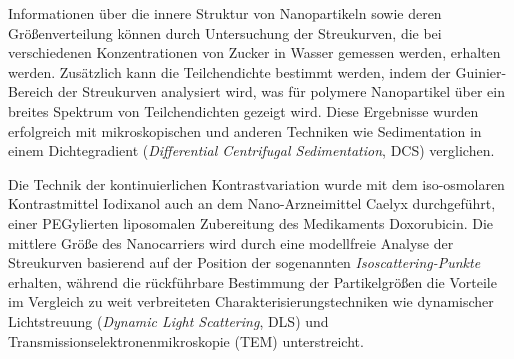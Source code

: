 


Informationen über die innere Struktur von Nanopartikeln sowie deren Größenverteilung können durch Untersuchung der Streukurven, die bei verschiedenen Konzentrationen von Zucker in Wasser gemessen werden, erhalten werden. Zusätzlich kann die Teilchendichte bestimmt werden, indem der Guinier-Bereich der Streukurven analysiert wird, was für polymere Nanopartikel über ein breites Spektrum von Teilchendichten gezeigt wird. Diese Ergebnisse wurden erfolgreich mit mikroskopischen und anderen Techniken wie Sedimentation in einem Dichtegradient (\emph{Differential Centrifugal Sedimentation}, DCS) verglichen.

Die Technik der kontinuierlichen Kontrastvariation wurde mit dem iso-osmolaren Kontrastmittel Iodixanol auch an dem Nano-Arzneimittel Caelyx durchgeführt, einer PEGylierten liposomalen Zubereitung des Medikaments Doxorubicin. Die mittlere Größe des Nanocarriers wird durch eine modellfreie Analyse der Streukurven basierend auf der Position der sogenannten \emph{Isoscattering-Punkte} erhalten, während die rückführbare Bestimmung der Partikelgrößen die Vorteile im Vergleich zu weit verbreiteten Charakterisierungstechniken wie dynamischer Lichtstreuung (\emph{Dynamic Light Scattering}, DLS) und Transmissionselektronenmikroskopie (TEM) unterstreicht.


